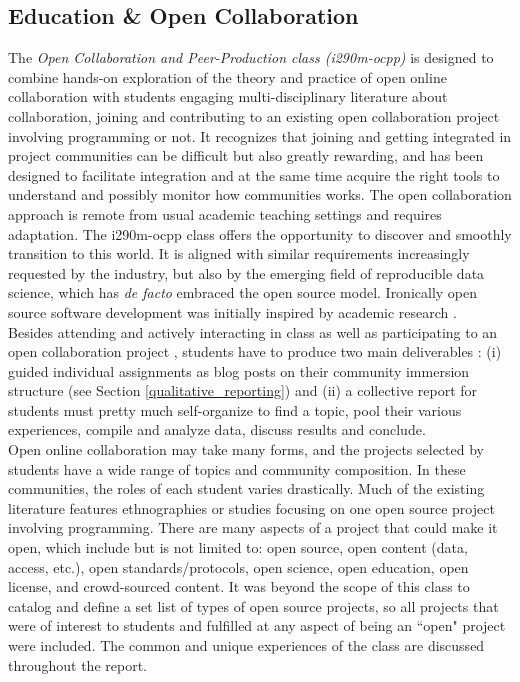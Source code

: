 \subsection{Education \& Open Collaboration}
\label{classmotivations}

The {\it Open Collaboration and Peer-Production class (i290m-ocpp)} is designed to combine hands-on exploration of the theory and practice of open online collaboration with students engaging multi-disciplinary literature about collaboration, joining and contributing to an existing open collaboration project involving programming or not. It recognizes that joining and getting integrated in project communities can be difficult but also greatly rewarding, and has been designed to facilitate integration and at the same time acquire the right tools to understand and possibly monitor how communities works. The open collaboration approach is remote from usual academic teaching settings and requires adaptation. The i290m-ocpp class offers the opportunity to discover and smoothly transition to this world. It is aligned with similar requirements increasingly requested by the industry, but also by the emerging field of reproducible data science, which has {\it de facto} embraced the open source model. Ironically open source software development  was initially inspired by academic research \cite{bezroukov1999oss}.\\

\noindent Besides attending and actively interacting in class as well as participating to an open collaboration project  \cite{classweb2013}, students have to produce two main deliverables : (i) guided individual assignments as blog posts on their community immersion structure (see Section \ref{qualitative_reporting}) and (ii) a collective report for students must pretty much self-organize to find a topic, pool their various experiences, compile and analyze data, discuss results and conclude. \\

\noindent Open online collaboration may take many forms, and the projects selected by students have a wide range of topics and community composition. In these communities, the roles of each student varies drastically. Much of the existing literature features ethnographies or studies focusing on one open source project involving programming. There are many aspects of a project that could make it open, which include but is not limited to: open source, open content (data, access, etc.), open standards/protocols, open science, open education, open license, and crowd-sourced content. It was beyond the scope of this class to catalog and define a set list of types of open source projects, so all projects that were of interest to students and fulfilled at any aspect of being an ``open" project were included. The common and unique experiences of the class are discussed throughout the report.\\

